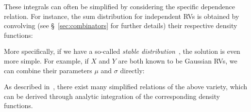 \documentclass{article}
\begin{document}
\begin{prooftree}
\end{prooftree}

These integrals can often be simplified by considering the specific dependence relation. For instance, the sum distribution for independent RVs is obtained by convolving (see \S~\ref{sec:combinators} for further details) their respective density functions:


\begin{prooftree}
\end{prooftree}

 More specifically, if we have a so-called \textit{stable distribution}~\citep{levy1925calcul}, the solution is even more simple. For example, if $X$ and $Y$ are both known to be Gaussian RVs, we can combine their parameters $\mu$ and $\sigma$ directly:


\begin{prooftree}
\end{prooftree}

As described in~\citet{willard2020minikanren}, there exist many simplified relations of the above variety, which can be derived through analytic integration of the corresponding density functions.

%
%
\end{document}

